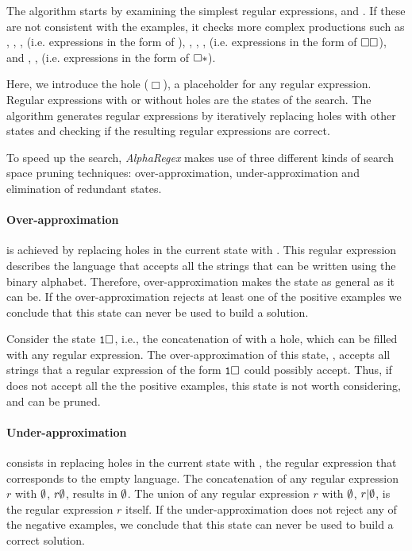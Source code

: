 The algorithm starts by examining the simplest regular expressions,  and .
If these are not consistent with the examples, it checks more complex productions such as , , ,  (i.e. expressions in the form of \regex{\Box|\Box}), , , ,  (i.e. expressions in the form of \(\tt\Box\Box\)), and , , (i.e. expressions in the form of \(\tt\Box*\)).

Here, we introduce the hole (\(\Box\)), a placeholder for any regular expression. Regular expressions with or without holes are the states of the search.
The algorithm generates regular expressions by iteratively replacing holes with other states and checking if the resulting regular expressions are correct.

To speed up the search, \textit{AlphaRegex} makes use of three different kinds of search space pruning techniques: over-approximation, under-approximation and elimination of redundant states.

\paragraph{Over-approximation} is achieved by replacing holes in the current state with .
This regular expression describes the language that accepts all the strings that can be written using the binary alphabet.
Therefore, over-approximation makes the state as general as it can be.
If the over-approximation rejects at least one of the positive examples we conclude that this state can never be used to build a solution.

\begin{example}
Consider the state \(\tt1\Box\), i.e., the concatenation of  with a hole, which can be filled with any regular expression. The over-approximation of this state, , accepts all strings that a regular expression of the form \(\tt1\Box\) could possibly accept. Thus, if  does not accept all the the positive examples, this state is not worth considering, and can be pruned.
\end{example}

\paragraph{Under-approximation} consists in replacing holes in the current state with \regex{\emptyset}, the regular expression that corresponds to the empty language. The concatenation of any regular expression \(r\) with \(\tt\emptyset\), \(r\tt\emptyset\), results in \(\tt\emptyset\). The union of any  regular expression \(r\) with \(\tt\emptyset\), \(r|\tt\emptyset\), is the regular expression \(r\) itself.
If the under-approximation does not reject any of the negative examples,  we conclude that this state can never be used to build a correct solution.

